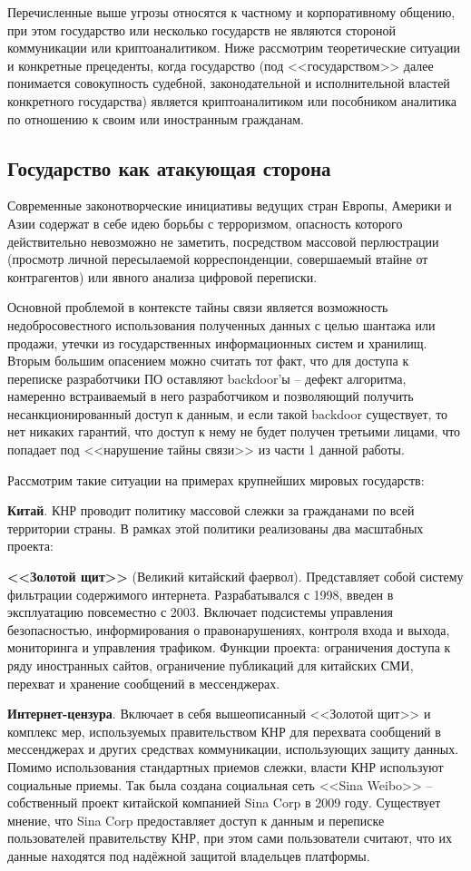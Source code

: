 	Перечисленные выше угрозы относятся к частному и корпоративному общению, при этом государство или несколько государств не являются  стороной коммуникации или криптоаналитиком. Ниже рассмотрим теоретические ситуации и конкретные прецеденты, когда государство (под <<государством>> далее понимается совокупность судебной, законодательной и исполнительной властей конкретного государства) является криптоаналитиком или пособником аналитика по отношению к своим или иностранным гражданам. 
	\subsection{Государство как атакующая сторона}
	
	Современные законотворческие инициативы  ведущих стран Европы, Америки и Азии содержат в себе идею борьбы с терроризмом, опасность которого действительно невозможно не заметить, посредством массовой перлюстрации (просмотр личной пересылаемой корреспонденции, совершаемый втайне от контрагентов) или явного анализа цифровой переписки. 
	
	Основной проблемой в контексте тайны связи является возможность недобросовестного использования полученных данных с целью шантажа или  продажи, утечки из государственных информационных систем и хранилищ. Вторым большим опасением можно считать тот факт, что для доступа к переписке разработчики ПО оставляют backdoor'ы -- дефект алгоритма,  намеренно встраиваемый  в него разработчиком и позволяющий  получить несанкционированный доступ к данным, и если такой backdoor существует, то нет никаких гарантий, что доступ к нему не будет получен третьими лицами, что попадает под <<нарушение тайны связи>> из части 1 данной работы.

	Рассмотрим такие ситуации на примерах крупнейших мировых государств:
	
	\textbf{Китай}. КНР проводит политику массовой слежки за гражданами по всей территории страны. В рамках этой политики реализованы два масштабных проекта: 
	
	\textbf{<<Золотой щит>>} (Великий китайский фаервол). Представляет собой  систему фильтрации содержимого интернета. Разрабатывался с 1998, введен в эксплуатацию повсеместно с 2003. Включает подсистемы управления безопасностью, информирования о правонарушениях, контроля входа и выхода, мониторинга и управления трафиком.  Функции проекта: ограничения доступа к ряду иностранных сайтов, ограничение публикаций для китайских СМИ, перехват и хранение сообщений в мессенджерах.
	
	\textbf{Интернет-цензура}. Включает в себя вышеописанный <<Золотой щит>> и комплекс мер, используемых правительством КНР для перехвата сообщений в мессенджерах и других средствах коммуникации, использующих защиту данных. 	Помимо использования стандартных приемов слежки, власти КНР используют социальные приемы. Так была создана социальная сеть <<Sina Weibo>> -- собственный проект китайской компанией Sina Corp в 2009 году. Существует мнение, что Sina Corp предоставляет доступ к данным и переписке пользователей правительству КНР, при этом сами пользователи считают, что их данные находятся под надёжной защитой владельцев платформы. 
	
\newpage